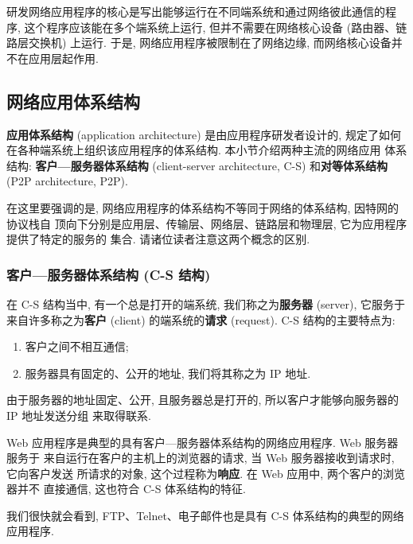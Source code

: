 \documentclass[10pt,UTF8]{book} %
\begin{document}
研发网络应用程序的核心是写出能够运行在不同端系统和通过网络彼此通信的程序,
这个程序应该能在多个端系统上运行, 但并不需要在网络核心设备 (路由器、链路层交换机)
上运行. 于是, 网络应用程序被限制在了网络边缘, 而网络核心设备并不在应用层起作用.

\subsection{网络应用体系结构}

\textbf{应用体系结构} (application architecture) 是由应用程序研发者设计的,
规定了如何在各种端系统上组织该应用程序的体系结构. 本小节介绍两种主流的网络应用
体系结构: \textbf{客户—服务器体系结构} (client-server architecture, C-S) 
和\textbf{对等体系结构} (P2P architecture, P2P).

在这里要强调的是, 网络应用程序的体系结构不等同于网络的体系结构, 因特网的协议栈自
顶向下分别是应用层、传输层、网络层、链路层和物理层, 它为应用程序提供了特定的服务的
集合. 请诸位读者注意这两个概念的区别.

\subsubsection{客户—服务器体系结构 (C-S 结构)}



在 C-S 结构当中, 有一个总是打开的端系统, 我们称之为\textbf{服务器} (server),
它服务于来自许多称之为\textbf{客户} (client) 的端系统的\textbf{请求} (request).
C-S 结构的主要特点为:
\begin{enumerate}[itemsep=0pt, label={$\left.\mathrm{\alph*}\right)$}]
    \item 客户之间不相互通信;
    \item 服务器具有固定的、公开的地址, 我们将其称之为 IP 地址.
\end{enumerate}
由于服务器的地址固定、公开, 且服务器总是打开的, 所以客户才能够向服务器的 IP 地址发送分组
来取得联系.

\begin{example}
    Web 应用程序是典型的具有客户—服务器体系结构的网络应用程序. Web 服务器服务于
    来自运行在客户的主机上的浏览器的请求, 当 Web 服务器接收到请求时, 它向客户发送
    所请求的对象, 这个过程称为\textbf{响应}. 在 Web 应用中, 两个客户的浏览器并不
    直接通信, 这也符合 C-S 体系结构的特征.
\end{example}
\begin{example}
    我们很快就会看到,
    FTP、Telnet、电子邮件也是具有 C-S 体系结构的典型的网络应用程序.
\end{example}
\end{document}
